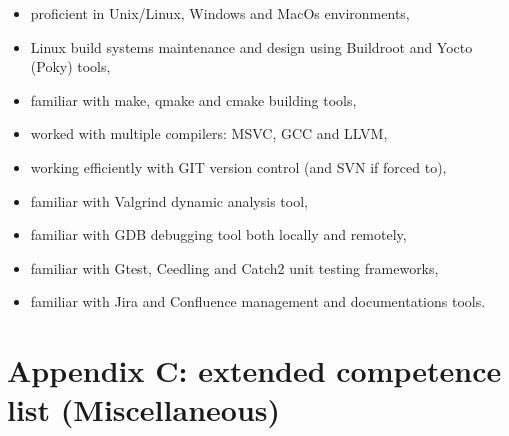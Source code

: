 \documentclass{tccv}
\begin{document}
\begin{itemize}
\begin{itemize}
               \item proficient in Unix/Linux, Windows and MacOs environments,
               \item Linux build systems maintenance and design using Buildroot and Yocto (Poky) tools,
               \item familiar with make, qmake and cmake building tools,
               \item worked with multiple compilers: MSVC, GCC and LLVM,
               \item working efficiently with GIT version control (and SVN if forced to),
               \item familiar with Valgrind dynamic analysis tool,
               \item familiar with GDB debugging tool both locally and remotely,          
               \item familiar with Gtest, Ceedling and Catch2 unit testing frameworks,    
               \item familiar with Jira and Confluence management and documentations tools.         
               
          \end{itemize}
\end{itemize}

\clearpage

\section{Appendix C: extended competence list (Miscellaneous)}
\end{document}
